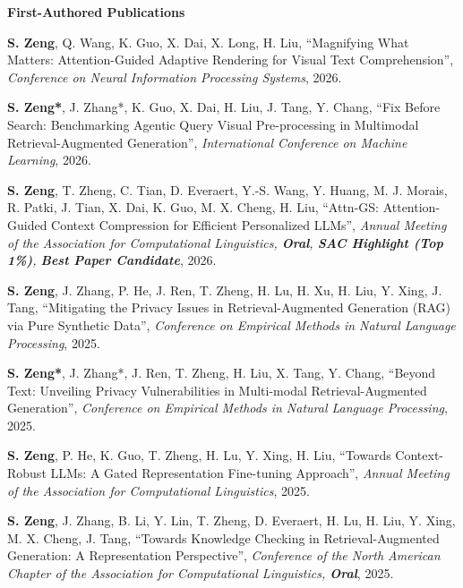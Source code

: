 \documentclass[11pt,a4paper,roman]{moderncv}        %
\newenvironment{publist}{%
  \begin{list}{}{%
    \setlength{\leftmargin}{34mm}%
    \setlength{\labelwidth}{32mm}%
    \setlength{\labelsep}{2mm}%
    \setlength{\itemsep}{1.4mm}%
    \setlength{\parsep}{0pt}%
    \setlength{\topsep}{1.5mm}%
    \renewcommand{\makelabel}[1]{\bfseries ##1\hfill}%
  }}{\end{list}}
\begin{document}
\vspace{2mm}
{\large\bfseries First-Authored Publications}
\vspace{-1mm}
\begin{publist}
\item[{[NeurIPS'26]}] \textbf{S. Zeng}, Q. Wang, K. Guo, X. Dai, X. Long, H. Liu, ``Magnifying What Matters: Attention-Guided Adaptive Rendering for Visual Text Comprehension'', \textit{Conference on Neural Information Processing Systems}, 2026.
\item[{[ICML'26]}] \textbf{S. Zeng*}, J. Zhang*, K. Guo, X. Dai, H. Liu, J. Tang, Y. Chang, ``Fix Before Search: Benchmarking Agentic Query Visual Pre-processing in Multimodal Retrieval-Augmented Generation'', \textit{International Conference on Machine Learning}, 2026.
\item[{[ACL'26, Oral]}] \textbf{S. Zeng}, T. Zheng, C. Tian, D. Everaert, Y.-S. Wang, Y. Huang, M. J. Morais, R. Patki, J. Tian, X. Dai, K. Guo, M. X. Cheng, H. Liu, ``Attn-GS: Attention-Guided Context Compression for Efficient Personalized LLMs'', \textit{Annual Meeting of the Association for Computational Linguistics, \textbf{\color{honor}Oral}, \textbf{\color{honor}SAC Highlight (Top 1\%)}, \textbf{\color{honor}Best Paper Candidate}}, 2026.
\item[{[EMNLP'25]}] \textbf{S. Zeng}, J. Zhang, P. He, J. Ren, T. Zheng, H. Lu, H. Xu, H. Liu, Y. Xing, J. Tang, ``Mitigating the Privacy Issues in Retrieval-Augmented Generation (RAG) via Pure Synthetic Data'', \textit{Conference on Empirical Methods in Natural Language Processing}, 2025.
\item[{[EMNLP'25]}] \textbf{S. Zeng*}, J. Zhang*, J. Ren, T. Zheng, H. Liu, X. Tang, Y. Chang, ``Beyond Text: Unveiling Privacy Vulnerabilities in Multi-modal Retrieval-Augmented Generation'', \textit{Conference on Empirical Methods in Natural Language Processing}, 2025.
\item[{[ACL'25]}] \textbf{S. Zeng}, P. He, K. Guo, T. Zheng, H. Lu, Y. Xing, H. Liu, ``Towards Context-Robust LLMs: A Gated Representation Fine-tuning Approach'', \textit{Annual Meeting of the Association for Computational Linguistics}, 2025.
\item[{[NAACL'25, Oral]}] \textbf{S. Zeng}, J. Zhang, B. Li, Y. Lin, T. Zheng, D. Everaert, H. Lu, H. Liu, Y. Xing, M. X. Cheng, J. Tang, ``Towards Knowledge Checking in Retrieval-Augmented Generation: A Representation Perspective'', \textit{Conference of the North American Chapter of the Association for Computational Linguistics, \textbf{\color{honor}Oral}}, 2025.

\end{publist}
\end{document}
